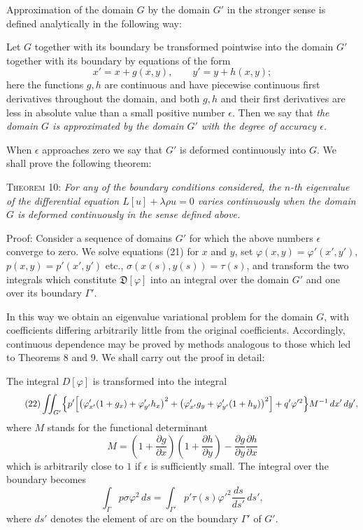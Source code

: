 Approximation of the domain $G$ by the domain $G'$ in the stronger sense is defined analytically in the following way:

Let $G$ together with its boundary be transformed pointwise into the domain $G'$ together with its boundary by equations of the form
\begin{equation}\tag{21}
x'=x+g(x,y),\qquad y'=y+h(x,y);
\end{equation}
here the functions $g,h$ are continuous and have piecewise continuous first derivatives throughout the domain, and both $g,h$ and their first derivatives are less in absolute value than a small positive number $\epsilon$. Then we say that \emph{the domain $G$ is approximated by the domain $G'$ with the degree of accuracy $\epsilon$.}

When $\epsilon$ approaches zero we say that $G'$ is deformed continuously into $G$. We shall prove the following theorem:

\textsc{Theorem 10:} \emph{For any of the boundary conditions considered, the $n$-th eigenvalue of the differential equation $L[u]+\lambda\rho u=0$ varies continuously when the domain $G$ is deformed continuously in the sense defined above.}

Proof: Consider a sequence of domains $G'$ for which the above numbers $\epsilon$ converge to zero. We solve equations (21) for $x$ and $y$, set $\varphi(x,y)=\varphi'(x',y')$, $p(x,y)=p'(x',y')$ etc., $\sigma(x(s),y(s))=\tau(s)$, and transform the two integrals which constitute $\mathfrak D[\varphi]$ into an integral over the domain $G'$ and one over its boundary $\Gamma'$.

In this way we obtain an eigenvalue variational problem for the domain $G$, with coefficients differing arbitrarily little from the original coefficients. Accordingly, continuous dependence may be proved by methods analogous to those which led to Theorems 8 and 9. We shall carry out the proof in detail:

The integral $D[\varphi]$ is transformed into the integral
\begin{equation}\tag{22}
\iint_{G'}\Bigl\{p'\Bigl[\bigl(\varphi_{x'}'(1+g_x)+\varphi_{y'}'h_x\bigr)^2
+\bigl(\varphi_{x'}'g_y+\varphi_{y'}'(1+h_y)\bigr)^2\Bigr]
+q'\varphi'^2\Bigr\}M^{-1}\,dx'\,dy',
\end{equation}
where $M$ stands for the functional determinant
\[
M=\left(1+\frac{\partial g}{\partial x}\right)\left(1+\frac{\partial h}{\partial y}\right)
-\frac{\partial g}{\partial y}\frac{\partial h}{\partial x}
\]
which is arbitrarily close to $1$ if $\epsilon$ is sufficiently small. The integral over the boundary becomes
\[
\int_\Gamma p\sigma\varphi^2\,ds
=\int_{\Gamma'}p'\tau(s)\varphi'^2\frac{ds}{ds'}\,ds',
\]
where $ds'$ denotes the element of arc on the boundary $\Gamma'$ of $G'$.

